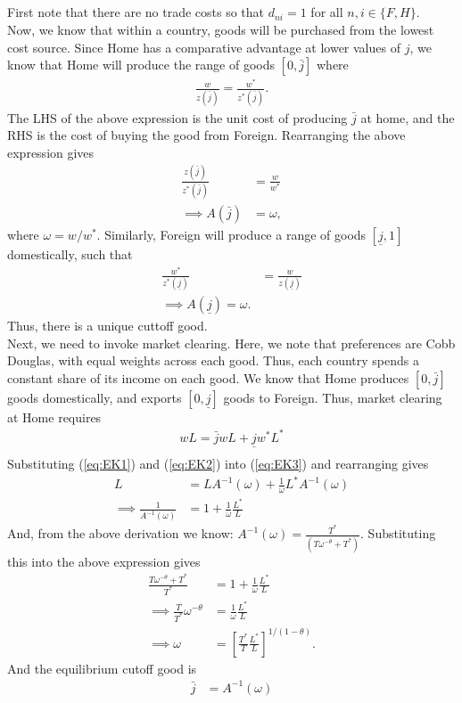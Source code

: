 \documentclass[12pt]{article}
\begin{document}
\newpage

\subsection{}
First note that there are no trade costs so that $d_{ni} = 1$ for all $n,i \in \{F,H\}$.\\

Now, we know that within a country, goods will be purchased from the lowest cost source. Since Home has a comparative advantage at lower values of $j$, we know that Home will produce the range of goods $[0,\bar j]$ where
\begin{align*}
\frac{w}{z(\bar j)} = \frac{w^*}{z^*(\bar j)}.
\end{align*}
The LHS of the above expression is the unit cost of producing $\bar j$ at home, and the RHS is the cost of buying the good from Foreign. Rearranging the above expression gives
\begin{align}
\frac{z(\bar j)}{z^*(\bar j)} &= \frac{w}{w^*} \nonumber\\
\implies A(\bar j) &= \omega, \label{eq:EK1}
\end{align}
where $\omega = w/w^*$. Similarly, Foreign will produce a range of goods $[\underline j, 1]$ domestically, such that
\begin{align}
\frac{w^*}{z^*(\underline j)} &= \frac{w}{z(\underline j)} \nonumber \\
\implies A(\underline j) = \omega. \label{eq:EK2}
\end{align}
Thus, there is a unique cuttoff good.\\

Next, we need to invoke market clearing. Here, we note that preferences are Cobb Douglas, with equal weights across each good. Thus, each country spends a constant share of its income on each good. We know that Home produces $[0,\bar j]$ goods domestically, and exports $[0, \underline j]$ goods to Foreign. Thus, market clearing at Home requires
\begin{align}
wL = \bar j wL + \underline j w^*L^* \label{eq:EK3}\\
\end{align}
Substituting (\ref{eq:EK1}) and (\ref{eq:EK2}) into (\ref{eq:EK3}) and rearranging gives
\begin{align*}
L &= L A^{-1}(\omega) + \frac{1}{\omega} L^* A^{-1}(\omega)\\
\implies \frac{1}{A^{-1}(\omega)} &= 1 + \frac{1}{\omega} \frac{L^*}{L} 
\end{align*}
And, from the above derivation we know: $A^{-1}(\omega) = \frac{T^*}{(T\omega^{-\theta}+T^*)}$. Substituting this into the above expression gives
\begin{align*}
\frac{T\omega^{-\theta}+T^*}{T^*} &= 1 +\frac{1}{\omega} \frac{L^*}{L}\\
\implies \frac{T}{T^*} \omega^{-\theta} &=\frac{1}{\omega} \frac{L^*}{L}\\
\implies \omega &= \left[\frac{T^*}{T}\frac{L^*}{L}\right]^{1/(1-\theta)}.
\end{align*}
And the equilibrium cutoff good is
\begin{align*}
\bar j &= A^{-1}(\omega)
\end{align*}
\end{document}
